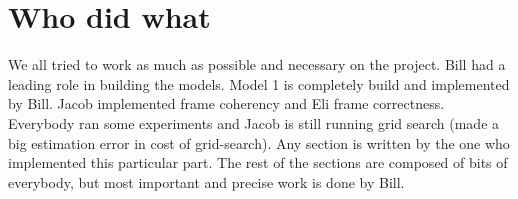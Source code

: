 \documentclass{article} %
\begin{document}
\section*{Who did what}
We all tried to work as much as possible and necessary on the project. Bill had a leading role in building the models. Model 1 is completely build and implemented by Bill. Jacob implemented frame coherency and Eli frame correctness. Everybody ran some experiments and Jacob is still running grid search (made a big estimation error in cost of grid-search). Any section is written by the one who implemented this particular part. The rest of the sections are composed of bits of everybody, but most important and precise work is done by Bill.


\end{document}
